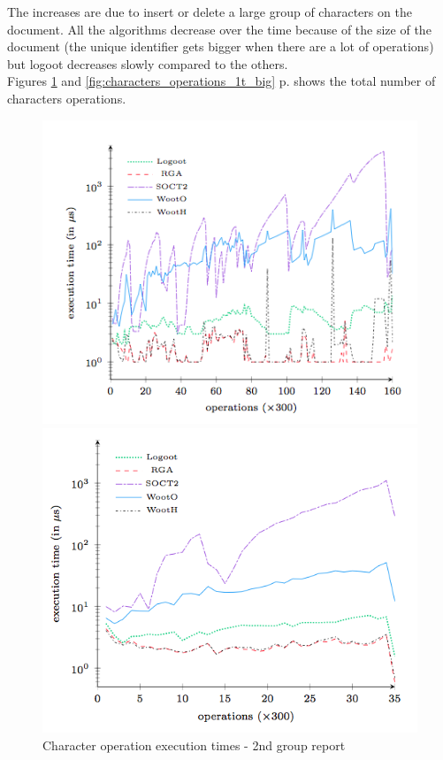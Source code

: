 The increases are due to insert or delete a large group of characters on the document. All the algorithms decrease over the time because of the size of the document (the unique identifier gets bigger when there are a lot of operations) but logoot decreases slowly compared to the others.\\

Figures \ref{fig:characters_operations_2g_report} and \ref{fig:characters_operations_1t_big} p.\pageref{fig:characters_operations_2g_report} shows the total number of characters operations.

\begin{figure}[h]
\begin{minipage}{0.50\linewidth}
\includegraphics[width=1.2\textwidth]{includes/characters_operations_2g_report.png}
  \caption{Character operation execution times - 2nd
group report}
  \label{fig:characters_operations_2g_report}
  \end{minipage} \hfill
  \begin{minipage}{.50\linewidth}
\includegraphics[width=1.2\textwidth]{includes/characters_operations_1t_big.png}

\end{minipage}
\end{figure}
